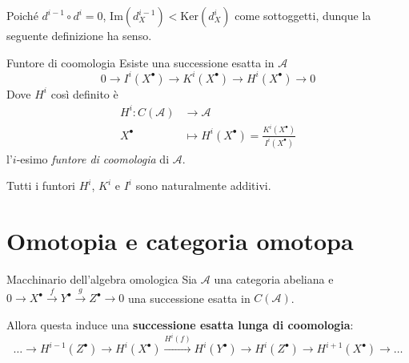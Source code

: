 Poiché \(d^{i-1} \circ d^{i} = 0\), \(\mathrm{Im}{(d_X^{i-1})} <
\mathrm{Ker}{(d_X^{i})}\) come sottoggetti, dunque la seguente definizione ha
senso.
\begin{definition}{Funtore di coomologia}
    Esiste una successione esatta in \(\mathcal{A}\) \[ 0 \to I^{i}{(X^\bullet)}
    \to K^{i}{(X^\bullet)} \to H^{i}{(X^\bullet)} \to 0\]
    Dove \(H^{i}\) così definito è
    \begin{align*}
        H^{i}: C{(\mathcal{A})} &\longrightarrow \mathcal{A} \\
        X^\bullet &\longmapsto H^{i}(X^\bullet) =
        \frac{K^{i}{(X^\bullet)}}{I^{i}{(X^\bullet)}}
    \end{align*}
    l'\(i\)-esimo \emph{funtore di coomologia} di \(\mathcal{A}\).
\end{definition}

\begin{proposition}{}
    Tutti i funtori \(H^{i}\), \(K^{i}\) e \(I^{i}\) sono naturalmente
    additivi.
\end{proposition}


\section{Omotopia e categoria omotopa}

\begin{theorem}{Macchinario dell'algebra omologica}\label{thm:LES}
    Sia \(\mathcal{A}\) una categoria abeliana e \(0 \to X^\bullet
    \overset{f}{\to} Y^\bullet \overset{g}{\to} Z^\bullet \to 0\) una
    successione esatta in \(C{(\mathcal{A})}\).

    Allora questa induce una \textbf{successione esatta lunga di coomologia}:
    \[
      \dots \to H^{i-1}{(Z^\bullet)} \to H^{i}{(X^\bullet)}
      \overset{H^{i}{(f)}}{\to} H^{i}{(Y^\bullet)} \to H^{i}{(Z^\bullet)} \to
      H^{i+1}{(X^\bullet)} \to \dots
    \]
\end{theorem}


